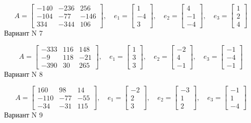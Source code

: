 \documentclass[11pt]{report}
\begin{document}
$$A = \left[\begin{matrix}-140 & -236 & 256\\-104 & -77 & -146\\334 & -344 & 106\end{matrix}\right],\quad e_1 = \left[\begin{matrix}1\\-4\\3\end{matrix}\right],\quad e_2 = \left[\begin{matrix}4\\-1\\-4\end{matrix}\right],\quad e_3 = \left[\begin{matrix}1\\2\\4\end{matrix}\right]$$Вариант N 7

$$A = \left[\begin{matrix}-333 & 116 & 148\\-9 & 118 & -21\\-390 & 30 & 265\end{matrix}\right],\quad e_1 = \left[\begin{matrix}1\\3\\3\end{matrix}\right],\quad e_2 = \left[\begin{matrix}-2\\4\\-1\end{matrix}\right],\quad e_3 = \left[\begin{matrix}-1\\-4\\-1\end{matrix}\right]$$Вариант N 8

$$A = \left[\begin{matrix}160 & 98 & 14\\-110 & -77 & -55\\-34 & -31 & 115\end{matrix}\right],\quad e_1 = \left[\begin{matrix}-2\\2\\3\end{matrix}\right],\quad e_2 = \left[\begin{matrix}-3\\1\\2\end{matrix}\right],\quad e_3 = \left[\begin{matrix}-1\\1\\-4\end{matrix}\right]$$Вариант N 9
\end{document}
